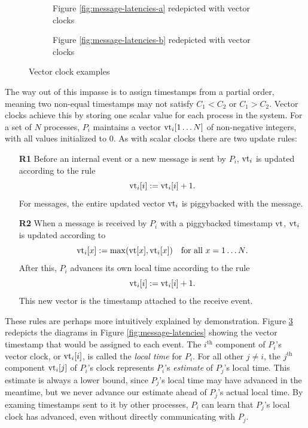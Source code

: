 \documentclass[]             %
{NASA}                       %
\theoremstyle{definition}
\begin{document}
\begin{figure}
  \setlength\belowcaptionskip{5ex}

  \begin{subfigure}{1\textwidth}
    \centering
    
    \caption{Figure \ref{fig:message-latencies-a} redepicted with vector clocks}
    \label{fig:message-latencies-vector-a}
  \end{subfigure}

  \vspace{4ex}

  \begin{subfigure}{1\textwidth}
    \centering 
    \caption{Figure \ref{fig:message-latencies-b} redepicted with vector clocks}
    \label{fig:message-latencies-vector-b}
  \end{subfigure}

  \caption{Vector clock examples}
  \label{fig:message-latencies-vector}
\end{figure}
\afterpage{\clearpage}

The way out of this impasse is to assign timestamps from a partial
order, meaning two non-equal timestamps may not satisfy $C_1 < C_2$ or
$C_1 > C_2$. Vector clocks achieve this by storing one scalar value
for each process in the system. For a set of $N$ processes, $P_i$
maintains a vector $\textrm{vt}_i[1 \ldots N]$ of non-negative integers, with
all values initialized to $0$. As with scalar clocks there
are two update rules:
\begin{enumerate}
\item[\textbf{R1}] Before an internal event or a new message is sent by $P_i$,
  $\textrm{vt}_i$ is updated according to the rule
  \[\textrm{vt}_i[i] := \textrm{vt}_i[i] + 1.\]
  For messages, the entire updated vector $\textrm{vt}_i$ is piggybacked with
  the message.
\item[\textbf{R2}] When a message is received by $P_i$ with a
  piggybacked timestamp $\textrm{vt}$, $\textrm{vt}_i$ is updated according to
  \[\textrm{vt}_i[x] := \max(\textrm{vt}[x], \textrm{vt}_i[x]) \quad \textrm{for all $x = 1\ldots N$}.\]
  After this, $P_i$ advances its own local time according to the rule
  \[ \textrm{vt}_i[i] := \textrm{vt}_i[i] + 1.\]
  This new vector is the timestamp attached to the receive event.
\end{enumerate}

These rules are perhaps more intuitively explained by demonstration.
Figure \ref{fig:message-latencies-vector} redepicts the diagrams in
Figure \ref{fig:message-latencies} showing the vector timestamp that
would be assigned to each event. The $i^\textrm{th}$ component of
$P_i$'s vector clock, or $\textrm{vt}_i[i]$, is called the \emph{local time}
for $P_i$. For all other $j \neq i$, the $j^\textrm{th}$ component
$\textrm{vt}_i[j]$ of $P_i$'s clock represents $P_i$'s \emph{estimate} of
$P_j$'s local time. This estimate is always a lower bound, since
$P_j$'s local time may have advanced in the meantime, but we never
advance our estimate ahead of $P_j$'s actual local time. By examing
timestamps sent to it by other processes, $P_i$ can learn that $P_j$'s
local clock has advanced, even without directly communicating with
$P_j$.
\end{document}
